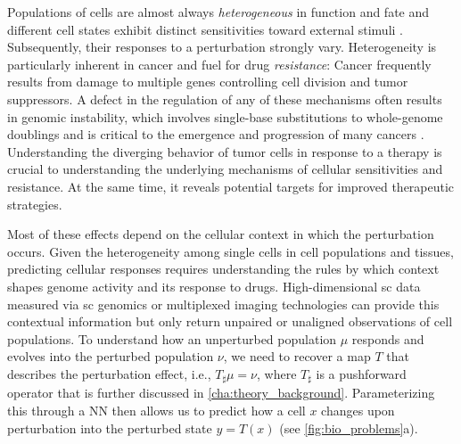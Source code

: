 Populations of cells are almost always \emph{heterogeneous} in function and fate and different cell states exhibit distinct sensitivities toward external stimuli \citep{spiller2010measurement}.
Subsequently, their responses to a perturbation strongly vary.
Heterogeneity is particularly inherent in cancer and fuel for drug \emph{resistance}: 
Cancer frequently results from damage to multiple genes controlling cell division and tumor suppressors.
A defect in the regulation of any of these mechanisms often results in genomic instability, which involves single-base substitutions to whole-genome doublings and
is critical to the emergence and progression of many cancers \citep{dagogo2018tumour}. Understanding the diverging behavior of tumor cells in response to a therapy is crucial to understanding the underlying mechanisms of cellular sensitivities and resistance.
At the same time, it reveals potential targets for improved therapeutic strategies.

Most of these effects depend on the cellular context in which the perturbation occurs. Given the heterogeneity among single cells in cell populations and tissues, predicting cellular responses requires understanding the rules by which context shapes genome activity and its response to drugs. High-dimensional \acrlong{sc} data measured via \acrlong{sc} genomics or multiplexed imaging technologies can provide this contextual information but only return unpaired or unaligned observations of cell populations.
To understand how an unperturbed population $\mu$ responds and evolves into the perturbed population $\nu$, we need to recover a map $T$ that describes the perturbation effect, i.e., $T_\sharp \mu = \nu$, where $T_\sharp$ is a pushforward operator that is further discussed in \cref{cha:theory_background}. Parameterizing this through a \acrlong{NN} then allows us to predict how a cell $x$ changes upon perturbation into the perturbed state $y= T(x)$ (see \cref{fig:bio_problems}a).



